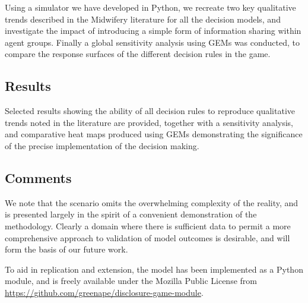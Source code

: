 Using a simulator we have developed in Python, we recreate two key qualitative trends described in the Midwifery literature for all the decision models, and investigate the impact of introducing a simple form of information sharing within agent groups.
Finally a global sensitivity analysis using \acp{GEM} was conducted, to compare the response surfaces of the different decision rules in the game.

\subsection*{Results} 

Selected results showing the ability of all decision rules to reproduce qualitative trends noted in the literature are provided, together with a sensitivity analysis, and comparative heat maps produced using \acp{GEM} demonstrating the significance of the precise implementation of the decision making.

\subsection*{Comments} 


We note that the scenario omits the overwhelming complexity of the reality, and is presented largely in the spirit of a convenient demonstration of the methodology. Clearly a domain where there is sufficient data to permit a more comprehensive approach to validation of model outcomes is desirable, and will form the basis of our future work.

To aid in replication and extension, the model has been implemented as a Python module, and is freely available under the Mozilla Public License from \url{https://github.com/greenape/disclosure-game-module}.